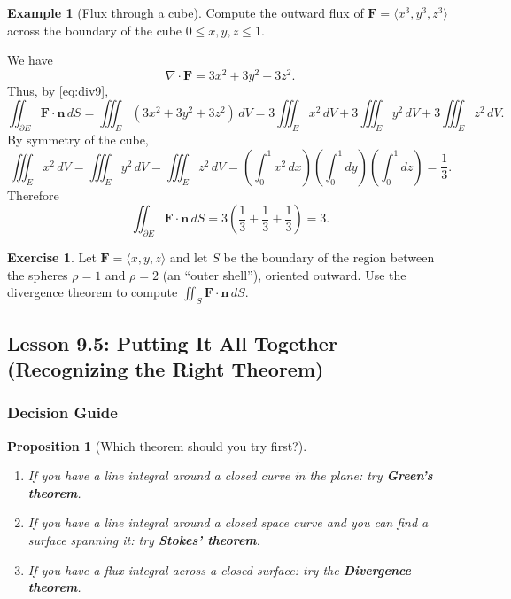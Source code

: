 \documentclass[12pt]{article}
\numberwithin{equation}{section}
\newcommand{\vect}[1]{\boldsymbol{#1}}   %
\theoremstyle{plain}
\newtheorem{proposition}[theorem]{Proposition}
\theoremstyle{definition}
\newtheorem{example}[theorem]{Example}
\newtheorem{exercise}[theorem]{Exercise}
\theoremstyle{remark}
\begin{document}
\begin{example}[Flux through a cube]\label{ex:div9-cube}
Compute the outward flux of $\vect F=\langle x^3,y^3,z^3\rangle$ across the boundary of the cube $0\le x,y,z\le 1$.

We have
\[
\nabla\cdot \vect F = 3x^2+3y^2+3z^2.
\]
Thus, by \cref{eq:div9},
\[
\iint_{\partial E}\vect F\cdot \vect n\,dS
=
\iiint_{E} (3x^2+3y^2+3z^2)\,dV
=
3\iiint_E x^2\,dV + 3\iiint_E y^2\,dV + 3\iiint_E z^2\,dV.
\]
By symmetry of the cube,
\[
\iiint_E x^2\,dV=\iiint_E y^2\,dV=\iiint_E z^2\,dV
=
\left(\int_0^1 x^2\,dx\right)\left(\int_0^1 dy\right)\left(\int_0^1 dz\right)
=\frac13.
\]
Therefore
\[
\iint_{\partial E}\vect F\cdot \vect n\,dS
=
3\left(\frac13+\frac13+\frac13\right)=3.
\]
\end{example}

\begin{exercise}
Let $\vect F=\langle x,y,z\rangle$ and let $S$ be the boundary of the region between the spheres $\rho=1$ and $\rho=2$ (an “outer shell”), oriented outward.
Use the divergence theorem to compute $\iint_S \vect F\cdot \vect n\,dS$.
\end{exercise}

\subsection{Lesson 9.5: Putting It All Together (Recognizing the Right Theorem)}

\subsubsection{Decision Guide}

\begin{proposition}[Which theorem should you try first?]\label{prop:decision-guide}
\begin{enumerate}[label=(\arabic*)]
\item If you have a \emph{line integral around a closed curve} in the plane: try \textbf{Green's theorem}.
\item If you have a \emph{line integral around a closed space curve} and you can find a surface spanning it: try \textbf{Stokes' theorem}.
\item If you have a \emph{flux integral across a closed surface}: try the \textbf{Divergence theorem}.
\end{enumerate}
\end{proposition}
\end{document}
